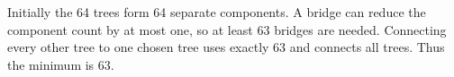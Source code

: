 Initially the 64 trees form 64 separate components. A bridge can reduce the component count by at most one, so at least 63 bridges are needed. Connecting every other tree to one chosen tree uses exactly 63 and connects all trees. Thus the minimum is $\boxed{63}$.
